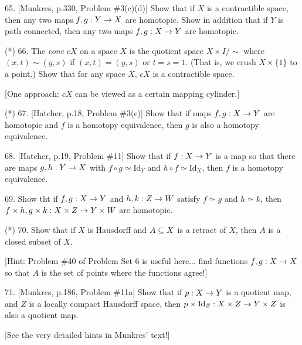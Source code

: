 \documentclass[12pt]{article}
\begin{document}
\begin{description}

\item{65.} [Munkres, p.330, Problem \#3(c)(d)] Show that if $X$ is a contractible 
space, then any two maps $f,g:Y\rightarrow X$ are homotopic. Show in addition that if
$Y$ is path connected, then any two maps $f,g:X\rightarrow Y$ are homotopic.

\msk

\item{(*)} 66. The {\it cone} $cX$ on a space $X$ is the quotient space $X\times I/\sim$ where
$(x,t)\sim(y,s)$ if $(x,t)=(y,s)$ or $t=s=1$. (That is, we crush $X\times\{1\}$ to a point.)
Show that for any space $X$, $cX$ is a contractible space.

\ssk

\item{\spc} [One approach: $cX$ can be viewed as a certain mapping cylinder.]

\msk

\item{(*)} 67. [Hatcher, p.18, Problem \#3(c)] Show that if maps $f,g:X\rightarrow Y$ are
homotopic and $f$ is a homotopy equivalence, then $g$ is also a homotopy equivalence.

\msk

\item{68.} [Hatcher, p.19, Problem \#11] Show that if $f:X\rightarrow Y$ is a map so that there
are maps $g,h:Y\rightarrow X$ with $f\circ g\simeq\textrm{Id}_Y$ and $h\circ f\simeq\textrm{Id}_X$,
then $f$ is a homotopy equivalence.

\msk

\item{69.} Show tht if $f,g:X\rightarrow Y$ and $h,k:Z\rightarrow W$ satisfy $f\simeq g$ and $h\simeq k$,
then $f\times h,g\times k:X\times Z\rightarrow Y\times W$ are homotopic.

\msk

\item{(*)} 70. Show that if $X$ is Hausdorff and $A\subseteq X$ is a retract of $X$, then $A$ is
a closed subset of $X$. 

\ssk

\item{\spc} [Hint: Problem \#40 of Problem Set 6 is useful here... find functions $f,g:X\rightarrow X$ so that
$A$ is the set of points where the functions agree!]

\msk

\item{71.} [Munkres, p.186, Problem \#11a] Show that if $p:X\rightarrow Y$ is a quotient
map, and $Z$ is a locally compact Hausdorff space, then 
$p\times\textrm{Id}_Z:X\times Z\rightarrow Y\times Z$ is also a quotient map.

\ssk

\item{\spc} [See the very detailed hints in Munkres' text!]

\msk

\end{description}
\vfill
\end{document}
